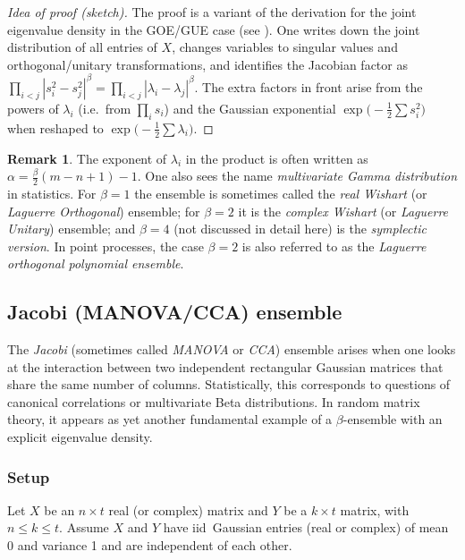 \documentclass[letterpaper,11pt,oneside,reqno]{article}
\numberwithin{equation}{section}
\theoremstyle{definition}
\newtheorem{remark}[proposition]{Remark}
\begin{document}
\begin{proof}[Idea of proof (sketch)]
The proof is a variant of the derivation for the joint eigenvalue density in the GOE/GUE case (see ).  One writes down the joint distribution of all entries of \(X\), changes variables to singular values and orthogonal/unitary transformations, and identifies the Jacobian factor as
\(\prod_{i<j}|s_i^2 - s_j^2|^\beta = \prod_{i<j}| \lambda_i - \lambda_j |^\beta\).
The extra factors in front arise from the powers of \(\lambda_i\) (i.e.\ from \(\prod_i s_i\)) and the Gaussian exponential \(\exp\bigl(-\frac12\sum s_i^2\bigr)\) when reshaped to \(\exp\bigl(-\frac12\sum \lambda_i\bigr)\).
\end{proof}
\begin{remark}
The exponent of \(\lambda_i\) in the product is often written as
\(\alpha = \frac{\beta}{2}(m-n+1)-1\).  One also sees the name \emph{multivariate Gamma distribution} in statistics.  For \(\beta=1\) the ensemble is sometimes called the \emph{real Wishart} (or \emph{Laguerre Orthogonal}) ensemble; for \(\beta=2\) it is the \emph{complex Wishart} (or \emph{Laguerre Unitary}) ensemble; and \(\beta=4\) (not discussed in detail here) is the \emph{symplectic version}.
In point processes, the case $\beta=2$ is
also referred to as the \emph{Laguerre orthogonal polynomial ensemble}.
\end{remark}


\subsection{Jacobi (MANOVA/CCA) ensemble}
\label{sec:Jacobi_MANOVA_CCA}

The \emph{Jacobi} (sometimes called \emph{MANOVA} or \emph{CCA}) ensemble arises when one looks at the interaction between two independent rectangular Gaussian matrices that share the same number of columns.  Statistically, this corresponds to questions of canonical correlations or multivariate Beta distributions.  In random matrix theory, it appears as yet another fundamental example of a \(\beta\)-ensemble with an explicit eigenvalue density.

\subsubsection{Setup}

Let \(X\) be an \(n\times t\) real (or complex) matrix and \(Y\) be a \(k\times t\) matrix, with \(n\le k \le t\).  Assume \(X\) and \(Y\) have iid\ Gaussian entries (real or complex) of mean 0 and variance 1 and are independent of each other.
\end{document}
